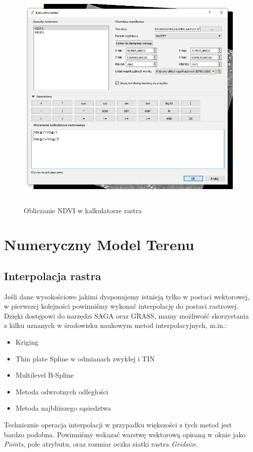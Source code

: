 \documentclass[12pt,a4paper]{book}
\begin{document}
\begin{center}
\begin{figure}
\includegraphics[width=13cm,height=11.532cm]{004-kalkulator-ndvi.png}
\caption{Obliczanie NDVI w kalkulatorze rastra}
\end{figure}
\end{center}

\section{Numeryczny Model Terenu}
\subsection{Interpolacja rastra}
Jeśli dane wysokościowe jakimi dysponujemy istnieją tylko w postaci wektorowej, w pierwszej kolejności powinniśmy wykonać interpolację do postaci rastrowej. Dzięki dostępowi do narzędzi SAGA oraz GRASS, mamy możliwość skorzystania z kilku uznanych w środowisku naukowym metod interpolacyjnych, m.in.:

\begin{itemize}
\item Kriging
\item Thin plate Spline w odmianach zwykłej i TIN
\item Multilevel B-Spline
\item Metoda odwrotnych odległości
\item Metoda najbliższego sąsiedztwa
\end{itemize}
Technicznie operacja interpolacji w przypadku większości z tych metod jest bardzo podobna. Powinniśmy wskazać warstwę wektorową opisaną w oknie jako \textit{Points}, pole atrybutu, oraz rozmiar oczka siatki rastra \textit{Gridsize}.
\end{document}
